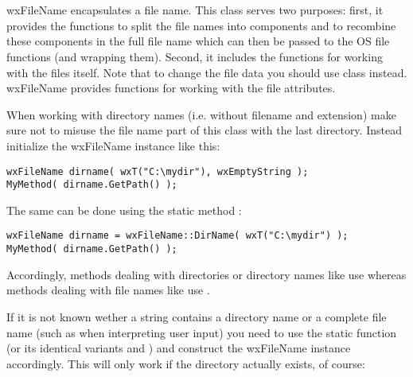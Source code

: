 
\section{}\label{wxfilename}

wxFileName encapsulates a file name. This class serves two purposes: first, it
provides the functions to split the file names into components and to recombine
these components in the full file name which can then be passed to the OS file
functions (and  wrapping them).
Second, it includes the functions for working with the files itself. Note that
to change the file data you should use  class instead.
wxFileName provides functions for working with the file attributes.

When working with directory names (i.e. without filename and extension)
make sure not to misuse the file name part of this class with the last
directory. Instead initialize the wxFileName instance like this:

\begin{verbatim}
wxFileName dirname( wxT("C:\mydir"), wxEmptyString );
MyMethod( dirname.GetPath() );
\end{verbatim}

The same can be done using the static method :

\begin{verbatim}
wxFileName dirname = wxFileName::DirName( wxT("C:\mydir") );
MyMethod( dirname.GetPath() );
\end{verbatim}

Accordingly, methods dealing with directories or directory names
like  use
 whereas methods dealing 
with file names like 
use .

If it is not known wether a string contains a directory name or
a complete file name (such as when interpreting user input) you need to use
the static function 
(or its identical variants  and
) and construct the wxFileName
instance accordingly. This will only work if the directory actually exists,
of course:

